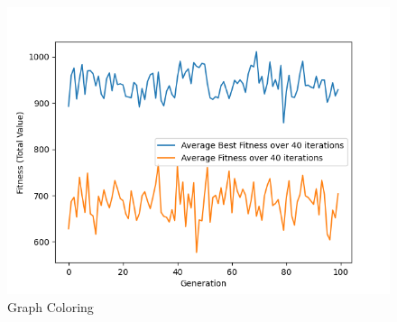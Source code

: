 \documentclass[11pt, letterpaper]{article}
\begin{document}
\begin{figure}[H]
  \includegraphics[width=\linewidth]{images/knapsack_rb_rd.png}
  \caption{Graph Coloring}
\endminipage
\end{figure}
\end{document}
